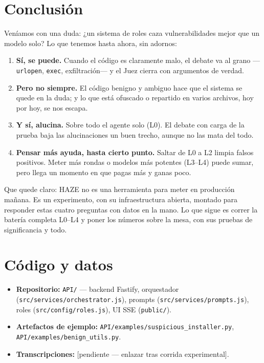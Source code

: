 \documentclass[10pt]{article}
\begin{document}
\section{Conclusión}

Veníamos con una duda: ¿un sistema de roles caza vulnerabilidades mejor que un modelo
solo? Lo que tenemos hasta ahora, sin adornos:

\begin{enumerate}[leftmargin=*]
  \item \textbf{Sí, se puede.} Cuando el código es claramente malo, el debate va al grano
  ---\texttt{urlopen}, \texttt{exec}, exfiltración--- y el Juez cierra con argumentos de
  verdad.
  \item \textbf{Pero no siempre.} El código benigno y ambiguo hace que el sistema se
  quede en la duda; y lo que está ofuscado o repartido en varios archivos, hoy por hoy,
  se nos escapa.
  \item \textbf{Y sí, alucina.} Sobre todo el agente solo (L0). El debate con carga de la
  prueba baja las alucinaciones un buen trecho, aunque no las mata del todo.
  \item \textbf{Pensar más ayuda, hasta cierto punto.} Saltar de L0 a L2 limpia falsos
  positivos. Meter más rondas o modelos más potentes (L3--L4) puede sumar, pero llega un
  momento en que pagas más y ganas poco.
\end{enumerate}

Que quede claro: HAZE no es una herramienta para meter en producción mañana. Es un
experimento, con su infraestructura abierta, montado para responder estas cuatro
preguntas con datos en la mano. Lo que sigue es correr la batería completa L0--L4 y poner
los números sobre la mesa, con sus pruebas de significancia y todo.

\section*{Código y datos}

\begin{itemize}[leftmargin=*]
  \item \textbf{Repositorio:} \texttt{API/} --- backend Fastify, orquestador
  (\texttt{src/services/orchestrator.js}), prompts (\texttt{src/services/prompts.js}),
  roles (\texttt{src/config/roles.js}), UI SSE (\texttt{public/}).
  \item \textbf{Artefactos de ejemplo:} \texttt{API/examples/suspicious\_installer.py},
  \texttt{API/examples/benign\_utils.py}.
  \item \textbf{Transcripciones:} [pendiente --- enlazar tras corrida experimental].
\end{itemize}
\end{document}

